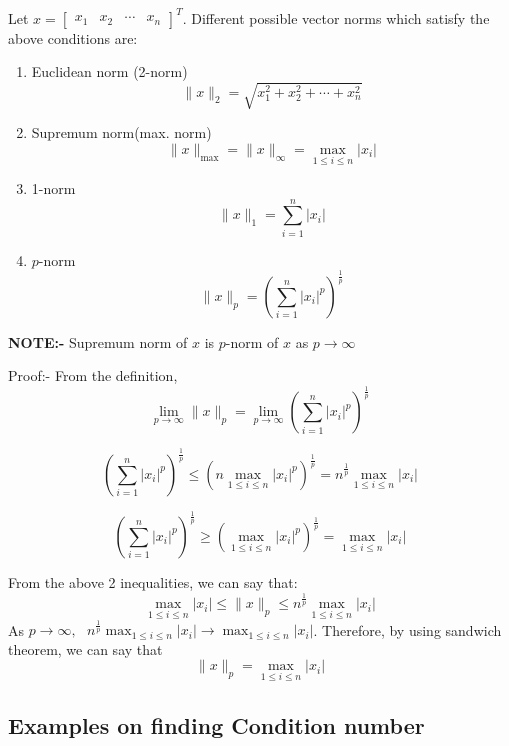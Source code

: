 \documentclass[
]{book}
\begin{document}
Let \(x =\begin{bmatrix} x_1 & x_2&\cdots &x_n \end{bmatrix}^T\). Different possible vector norms which satisfy the above conditions are:

\begin{enumerate}
\def\labelenumi{\arabic{enumi}.}
\item
  Euclidean norm (2-norm)
  \begin{equation}
  \lVert x \rVert_2 = \sqrt{x_1^2+x_2^2+\cdots+x_n^2}
  \end{equation}
\item
  Supremum norm(max. norm)
  \begin{equation}
  \lVert x \rVert_{\max} = \lVert x \rVert_{\infty} = \max_{1\le i\le n} |x_i|
  \end{equation}
\item
  1-norm
  \begin{equation}
  \lVert x \rVert_1 = \sum_{i=1}^n |x_i|
  \end{equation}
\item
  \(p\)-norm
  \begin{equation}
  \lVert x \rVert_{p} = \left(\sum_{i=1}^n |x_i|^p\right)^{\frac{1}{p}}
  \end{equation}
\end{enumerate}

\textbf{NOTE:-} Supremum norm of \(x\) is \(p\)-norm of \(x\) as \(p\to\infty\)

Proof:- From the definition, \[\lim_{p\to\infty} \lVert x \rVert_p = \lim_{p\to\infty}\left(\sum_{i=1}^n |x_i|^p\right)^{\frac{1}{p}}\]

\[\left(\sum_{i=1}^n |x_i|^p\right)^{\frac{1}{p}} \le \left( n\max_{1\le i\le n} |x_i|^p \right)^{\frac{1}{p}} = n^{\frac{1}{p}} \max_{1\le i\le n} |x_i|\]

\[\left(\sum_{i=1}^n |x_i|^p\right)^{\frac{1}{p}} \ge \left( \max_{1\le i\le n} |x_i|^p \right)^{\frac{1}{p}} = \max_{1\le i\le n} |x_i|\]

From the above 2 inequalities, we can say that:
\[\max_{1\le i\le n} |x_i| \le \lVert x \rVert_p \le n^{\frac{1}{p}} \max_{1\le i\le n} |x_i|\]
As \(p \to \infty,\ \  \ n^{\frac{1}{p}} \max_{1\le i\le n} |x_i| \to \max_{1\le i\le n} |x_i|\). Therefore, by using sandwich theorem, we can say that \[\lVert x \rVert_p = \max_{1\le i\le n} |x_i|\]

\hypertarget{examples-on-finding-condition-number}{%
\subsection{Examples on finding Condition number}\label{examples-on-finding-condition-number}}
\end{document}
